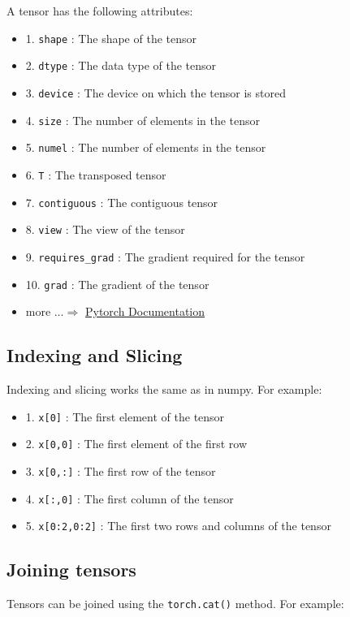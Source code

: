 \documentclass{article}
\begin{document}
A tensor has the following attributes:
\begin{itemize}
    \item 1. \texttt{shape} : The shape of the tensor
    \item 2. \texttt{dtype} : The data type of the tensor
    \item 3. \texttt{device} : The device on which the tensor is stored
    \item 4. \texttt{size} : The number of elements in the tensor
    \item 5. \texttt{numel} : The number of elements in the tensor
    \item 6. \texttt{T} : The transposed tensor
    \item 7. \texttt{contiguous} : The contiguous tensor
    \item 8. \texttt{view} : The view of the tensor
    \item 9. \texttt{requires\_grad} : The gradient required for the tensor
    \item 10. \texttt{grad} : The gradient of the tensor
    \item more $\dots \Rightarrow$ \href{https://pytorch.org/docs/stable/tensors.html}{Pytorch Documentation}
\end{itemize}

\subsection{Indexing and Slicing}

Indexing and slicing works the same as in numpy. For example:
\begin{itemize}
    \item 1. \texttt{x[0]} : The first element of the tensor
    \item 2. \texttt{x[0,0]} : The first element of the first row
    \item 3. \texttt{x[0,:]} : The first row of the tensor
    \item 4. \texttt{x[:,0]} : The first column of the tensor
    \item 5. \texttt{x[0:2,0:2]} : The first two rows and columns of the tensor
\end{itemize}

\subsection{Joining tensors}

Tensors can be joined using the \texttt{torch.cat()} method. For example:
\end{document}
